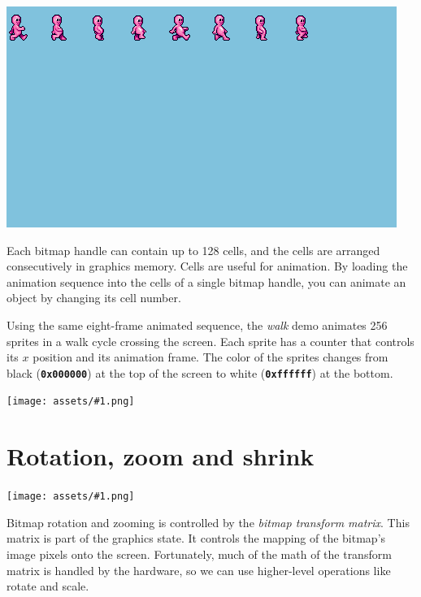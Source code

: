 \documentclass[10pt]{book}
\newcommand{\png}[1]{
\begin{center}
\texttt{[image: assets/\#1.png]}
\end{center}
}
\newcommand{\mach}[1]{\texttt{\textbf{#1}}}
\newcommand{\term}[1]{\emph{#1}\index{#1}}
\begin{document}
\noindent
\includegraphics[width=\textwidth,trim=0 216 80 0,clip=true]{assets/0058.png}

Each bitmap handle can contain up to 128 cells, and the cells are arranged
consecutively in graphics memory.
Cells are useful for animation.
By loading the animation sequence into the cells of a single bitmap handle,
you can animate an object by changing its cell number.

Using the same eight-frame animated sequence,
the \textit{walk} demo animates 256 sprites in a walk cycle crossing the screen.
Each sprite has a counter that controls its $x$ position and its animation frame.
The color of the sprites changes from black (\mach{0x000000}) at the top of the screen to white (\mach{0xffffff}) at the bottom.

\newpage
\png{walk}


\newpage
\section{Rotation, zoom and shrink}
\png{0043}

Bitmap rotation and zooming is controlled by the
\term{bitmap transform matrix}.
This matrix is part of the graphics state.
It controls the mapping of the bitmap's image pixels onto the screen.
Fortunately, much of the math of the transform matrix is handled by the hardware, so
we can use higher-level operations like rotate and scale.
\end{document}

